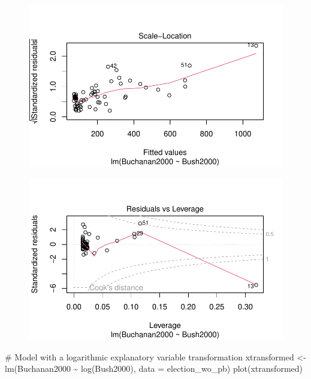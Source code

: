 \documentclass[
  letterpaper,
  DIV=11,
  numbers=noendperiod]{scrartcl}
\newenvironment{Shaded}{\begin{snugshade}}{\end{snugshade}}
\newcommand{\AttributeTok}[1]{\textcolor[rgb]{0.40,0.45,0.13}{#1}}
\newcommand{\CommentTok}[1]{\textcolor[rgb]{0.37,0.37,0.37}{#1}}
\newcommand{\FunctionTok}[1]{\textcolor[rgb]{0.28,0.35,0.67}{#1}}
\newcommand{\NormalTok}[1]{\textcolor[rgb]{0.00,0.23,0.31}{#1}}
\newcommand{\OtherTok}[1]{\textcolor[rgb]{0.00,0.23,0.31}{#1}}
\newcommand{\SpecialCharTok}[1]{\textcolor[rgb]{0.37,0.37,0.37}{#1}}
\begin{document}
\begin{figure}[H]

{\centering \includegraphics{case_study_1_files/figure-pdf/unnamed-chunk-6-4.pdf}

}

\end{figure}

\begin{figure}[H]

{\centering \includegraphics{case_study_1_files/figure-pdf/unnamed-chunk-6-5.pdf}

}

\end{figure}

\begin{Shaded}
\begin{Highlighting}[]
\CommentTok{\# Model with a logarithmic explanatory variable transformation}
\NormalTok{xtransformed }\OtherTok{\textless{}{-}} \FunctionTok{lm}\NormalTok{(Buchanan2000 }\SpecialCharTok{\textasciitilde{}} \FunctionTok{log}\NormalTok{(Bush2000), }\AttributeTok{data =}\NormalTok{ election\_wo\_pb)}
\FunctionTok{plot}\NormalTok{(xtransformed)}
\end{Highlighting}
\end{Shaded}
\end{document}
